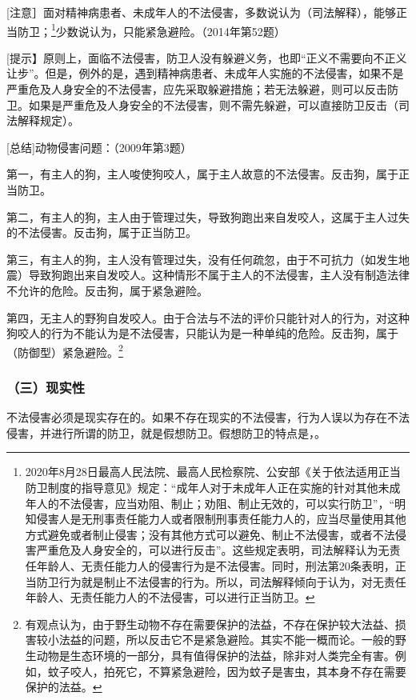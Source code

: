 [注意］面对精神病患者、未成年人的不法侵害，多数说认为（司法解释），能够正当防卫；\footnote{2020年8月28日最高人民法院、最高人民检察院、公安部《关于依法适用正当防卫制度的指导意见》规定：“成年人对于未成年人正在实施的针对其他未成年人的不法侵害，应当劝阻、制止；劝阻、制止无效的，可以实行防卫”，“明知侵害人是无刑事责任能力人或者限制刑事责任能力人的，应当尽量使用其他方式避免或者制止侵害；没有其他方式可以避免、制止不法侵害，或者不法侵害严重危及人身安全的，可以进行反击”。这些规定表明，司法解释认为无责任年龄人、无责任能力人的侵害行为是不法侵害。同时，刑法第20条表明，正当防卫行为就是制止不法侵害的行为。所以，司法解释倾向于认为，对无责任年龄人、无责任能力人的不法侵害，可以进行正当防卫。}少数说认为，只能紧急避险。（2014年第52题）

[提示】原则上，面临不法侵害，防卫人没有躲避义务，也即“正义不需要向不正义让步”。但是，例外的是，遇到精神病患者、未成年人实施的不法侵害，如果不是严重危及人身安全的不法侵害，应先采取躲避措施；若无法躲避，则可以反击防卫。如果是严重危及人身安全的不法侵害，则不需先躲避，可以直接防卫反击（司法解释规定）。

[总结]动物侵害问题：（2009年第3题）

第一，有主人的狗，主人唆使狗咬人，属于主人故意的不法侵害。反击狗，属于正当防卫。

第二，有主人的狗，主人由于管理过失，导致狗跑出来自发咬人，这属于主人过失的不法侵害。反击狗，属于正当防卫。

第三，有主人的狗，主人没有管理过失，没有任何疏忽，由于不可抗力（如发生地震）导致狗跑出来自发咬人。这种情形不属于主人的不法侵害，主人没有制造法律不允许的危险。反击狗，属于紧急避险。

第四，无主人的野狗自发咬人。由于合法与不法的评价只能针对人的行为，对这种狗咬人的行为不能认为是不法侵害，只能认为是一种单纯的危险。反击狗，属于（防御型）紧急避险。\footnote{有观点认为，由于野生动物不存在需要保护的法益，不存在保护较大法益、损害较小法益的问题，所以反击它不是紧急避险。其实不能一概而论。一般的野生动物是生态环境的一部分，具有值得保护的法益，除非对人类完全有害。例如，蚊子咬人，拍死它，不算紧急避险，因为蚊子是害虫，其本身不存在需要保护的法益。}

\subsubsection*{（三）现实性}

不法侵害必须是现实存在的。如果不存在现实的不法侵害，行为人误以为存在不法侵害，并进行所谓的防卫，就是假想防卫。假想防卫的特点是，。

